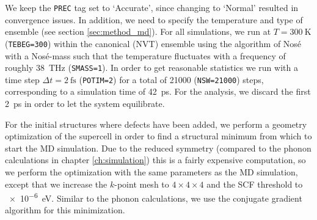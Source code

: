 We keep the \texttt{PREC} tag set to `Accurate', since changing to `Normal' resulted in convergence issues. In addition, we need to specify the temperature and type of ensemble (see section \ref{sec:method_md}). For all simulations, we run at $T=\SI{300}{\kelvin}$ (\texttt{TEBEG=300}) within the canonical (NVT) ensemble using the algorithm of Nos\'{e} with a Nos\'{e}-mass such that the temperature fluctuates with a frequency of roughly \SI{38}{\tera\hertz} (\texttt{SMASS=1}). In order to get reasonable statistics we run with a time step $\Delta t = \SI{2}{\femto\second}$ (\texttt{POTIM=2}) for a total of 21000 (\texttt{NSW=21000}) steps, corresponding to a simulation time of \SI{42}{\pico\second}. For the analysis, we discard the first \SI{2}{\pico\second} in order to let the system equilibrate.

For the initial structures where defects have been added, we perform a geometry optimization of the supercell in order to find a structural minimum from which to start the MD simulation. Due to the reduced symmetry (compared to the phonon calculations in chapter \ref{ch:simulation}) this is a fairly expensive computation, so we perform the optimization with the same parameters as the MD simulation, except that we increase the $k$-point mesh to $4 \times 4 \times 4$ and the SCF threshold to \SI{e-6}{\eV}. Similar to the phonon calculations, we use the conjugate gradient algorithm for this minimization.

